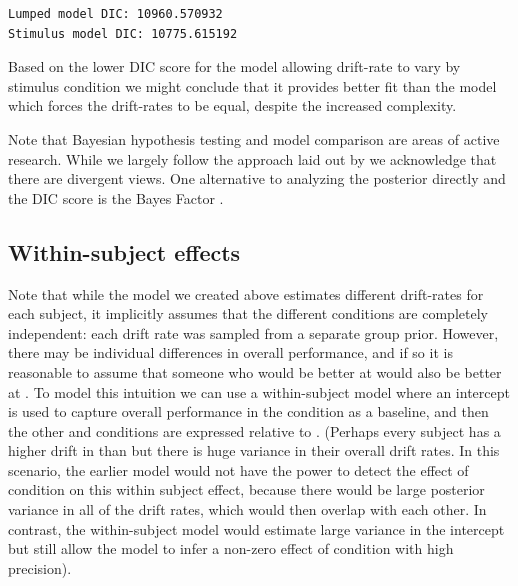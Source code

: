 \documentclass[letterpaper,10pt,english]{article}
\begin{document}
\begin{Verbatim}[commandchars=\\\{\}]
Lumped model DIC: 10960.570932
Stimulus model DIC: 10775.615192
\end{Verbatim}

Based on the lower DIC score for the model allowing drift-rate to vary by stimulus condition we might conclude that it provides better fit than the model which forces the drift-rates to be equal, despite the increased complexity.

Note that Bayesian hypothesis testing and model comparison are areas of active research. While we largely follow the approach laid out by \citep{Kruschke10} we acknowledge that there are divergent views. One alternative to analyzing the posterior directly and the DIC score is the Bayes Factor \citep[e.g.][]{WagenmakersLodewyckxKuriyalEtAl10}.

\subsection*{Within-subject effects}
\label{demo:within-subject-effects}
Note that while the  model we created above estimates different drift-rates  for each subject, it implicitly assumes that the different conditions are completely independent:  each drift rate was sampled from a separate group prior. However, there may be individual differences in overall performance, and if so it is reasonable to assume that someone who would be better at  would also be better at . To model this intuition we can use a within-subject model where an intercept is used to capture overall performance in the  condition as a baseline, and then the other  and  conditions are expressed relative to . (Perhaps every subject has a higher drift in  than  but there is huge variance in their overall drift rates. In this scenario, the earlier model would not have the power to detect the effect of condition on this within subject effect, because there would be large posterior variance in all of the drift rates, which would then overlap with each other.  In contrast, the within-subject model would estimate large variance in the intercept but still allow the model to infer a non-zero effect of condition with high precision).
\end{document}
